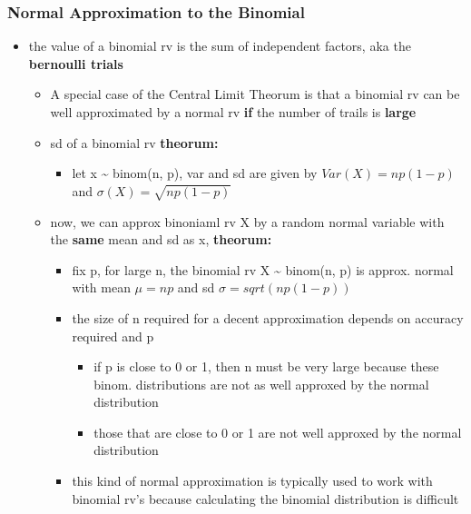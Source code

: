 \documentclass[
]{article}
\providecommand{\tightlist}{%
  \setlength{\itemsep}{0pt}\setlength{\parskip}{0pt}}
\begin{document}
\hypertarget{normal-approximation-to-the-binomial}{%
\subsubsection{Normal Approximation to the
Binomial}\label{normal-approximation-to-the-binomial}}

\begin{itemize}
\tightlist
\item
  the value of a binomial rv is the sum of independent factors, aka the
  \textbf{bernoulli trials}

  \begin{itemize}
  \tightlist
  \item
    A special case of the Central Limit Theorum is that a binomial rv
    can be well approximated by a normal rv \textbf{if} the number of
    trails is \textbf{large}
  \item
    sd of a binomial rv \textbf{theorum:}

    \begin{itemize}
    \tightlist
    \item
      let x \textasciitilde{} binom(n, p), var and sd are given by
      \(Var(X) = np(1-p)\) and \(\sigma (X) = \sqrt{np(1-p)}\)
    \end{itemize}
  \item
    now, we can approx binoniaml rv X by a random normal variable with
    the \textbf{same} mean and sd as x, \textbf{theorum:}

    \begin{itemize}
    \tightlist
    \item
      fix p, for large n, the binomial rv X \textasciitilde{} binom(n,
      p) is approx. normal with mean \(\mu = np\) and sd
      \(\sigma = sqrt(np(1-p))\)
    \item
      the size of n required for a decent approximation depends on
      accuracy required and p

      \begin{itemize}
      \tightlist
      \item
        if p is close to 0 or 1, then n must be very large because these
        binom. distributions are not as well approxed by the normal
        distribution
      \item
        those that are close to 0 or 1 are not well approxed by the
        normal distribution
      \end{itemize}
    \item
      this kind of normal approximation is typically used to work with
      binomial rv's because calculating the binomial distribution is
      difficult


\end{itemize}
\end{itemize}
\end{itemize}
\end{document}
